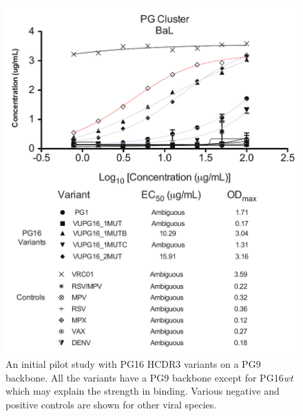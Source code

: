 \begin{figure}[!t]
   \centering
   \includegraphics[scale=.5]{images/chapter5/figure5_4.pdf}
   \caption[Binding Profile of PG16 Variants]{An initial pilot study with PG16 HCDR3 variants on a PG9 backbone. All the variants have a PG9 backbone except for PG16\textit{wt} which may explain the strength in binding. Various negative and positive controls are shown for other viral species.}
    \label{fig:fig5_4}
\end{figure}





